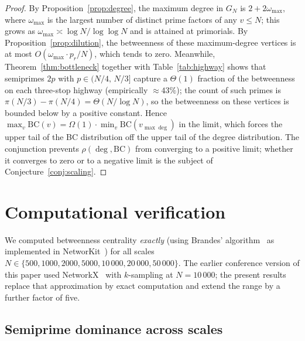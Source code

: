 \documentclass[11pt]{article}
\theoremstyle{plain}
\theoremstyle{definition}
\newcommand{\BC}{\mathrm{BC}}
\begin{document}
\begin{proof}
By Proposition~\ref{prop:degree}, the maximum degree in $G_N$ is
$2 + 2\omega_{\max}$, where $\omega_{\max}$ is the largest number of distinct prime factors
of any $v \le N$; this grows as $\omega_{\max} \asymp \log N / \log\log N$ and is attained at primorials.
By Proposition~\ref{prop:dilution}, the betweenness of these maximum-degree vertices is at most
$O(\omega_{\max} \cdot p_r / N)$, which tends to zero.
Meanwhile, Theorem~\ref{thm:bottleneck} together with Table~\ref{tab:highway} shows that semiprimes
$2p$ with $p \in (N/4,\, N/3]$ capture a $\Theta(1)$ fraction of the betweenness on each three-stop highway
(empirically $\approx 43\%$); the count of such primes is $\pi(N/3) - \pi(N/4) = \Theta(N/\log N)$,
so the betweenness on these vertices is bounded below by a positive constant.
Hence $\max_v \BC(v) = \Omega(1) \cdot \min_v \BC(v_{\max\deg})$ in the limit, which forces the upper tail
of the BC distribution off the upper tail of the degree distribution. The conjunction prevents
$\rho(\deg, \BC)$ from converging to a positive limit; whether it converges to zero or to a negative limit
is the subject of Conjecture~\ref{conj:scaling}.
\end{proof}


\section{Computational verification}

We computed betweenness centrality \emph{exactly} (using Brandes' algorithm~\cite{Brandes2001}
as implemented in NetworKit~\cite{NetworKit2016}) for all scales $N \in \{500, 1000, 2000, 5000, 10\,000, 20\,000, 50\,000\}$.
The earlier conference version of this paper used NetworkX~\cite{Hagberg2008} with $k$-sampling at $N = 10\,000$;
the present results replace that approximation by exact computation and extend the range by a further factor of five.

\subsection{Semiprime dominance across scales}
\end{document}
